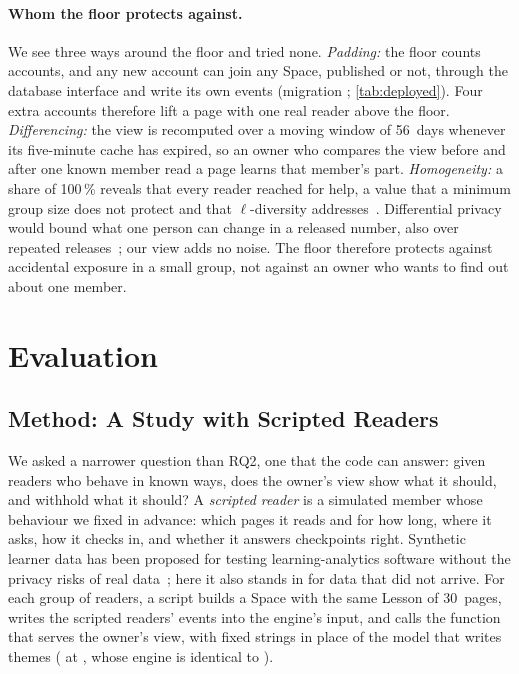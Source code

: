 \paragraph{Whom the floor protects against.}
We see three ways around the floor and tried none. \emph{Padding:} the floor counts accounts, and any new
account can join any Space, published or not, through the database interface
and write its own events (migration ;
\cref{tab:deployed}). Four extra accounts therefore lift a page with one real
reader above the floor. \emph{Differencing:} the view is recomputed over a
moving window of 56~days whenever its five-minute cache has expired, so an
owner who compares the view before and after one known member read a page
learns that member's part. \emph{Homogeneity:} a share of 100\,\% reveals that
every reader reached for help, a value that a minimum group size does not
protect and that $\ell$-diversity
addresses~\cite{machanavajjhala2007ldiversity}. Differential privacy would
bound what one person can change in a released number, also over repeated
releases~\cite{dwork2006dp}; our view adds no noise. The floor therefore
protects against accidental exposure in a small group, not against an owner
who wants to find out about one member.

\section{Evaluation}
\label{sec:c5-evaluation}

\subsection{Method: A Study with Scripted Readers}
\label{sec:c5-method}

We asked a narrower question than RQ2, one that the code can answer: given
readers who behave in known ways, does the owner's view show what it should,
and withhold what it should? A \emph{scripted reader} is a simulated member
whose behaviour we fixed in advance: which pages it reads and for how long,
where it asks, how it checks in, and whether it answers checkpoints right.
Synthetic learner data has been proposed for testing learning-analytics
software without the privacy risks of real data~\cite{berg2016synthetic};
here it also stands in for data that did not arrive. For each group of readers, a script builds a
Space with the same Lesson of 30~pages, writes the scripted readers' events into the
engine's input, and calls the function that serves the owner's view, with
fixed strings in place of the model that writes themes
( at , whose engine is
identical to ).

